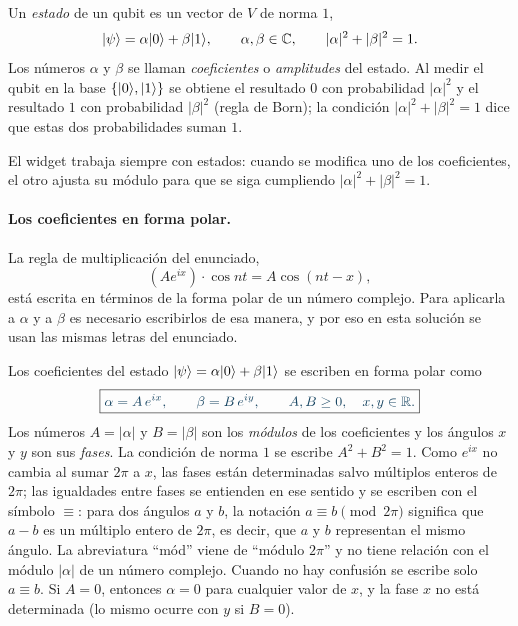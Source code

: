 \begin{definicionT}
Un \emph{estado} de un qubit es un vector de $V$ de norma $1$,
\begin{equation}\label{eq:estado}
  \lvert \psi\rangle=\alpha\lvert 0\rangle+\beta\lvert 1\rangle,\qquad \alpha,\beta\in\mathbb C,\qquad |\alpha|^2+|\beta|^2=1 .
\end{equation}
Los números $\alpha$ y $\beta$ se llaman \emph{coeficientes} o \emph{amplitudes} del estado. Al
medir el qubit en la base $\{\lvert 0\rangle,\lvert 1\rangle\}$ se obtiene el resultado $0$ con probabilidad
$|\alpha|^2$ y el resultado $1$ con probabilidad $|\beta|^2$ (regla de Born); la condición
$|\alpha|^2+|\beta|^2=1$ dice que estas dos probabilidades suman $1$.
\end{definicionT}

El widget trabaja siempre con estados: cuando se modifica uno de los coeficientes, el otro
ajusta su módulo para que se siga cumpliendo $|\alpha|^2+|\beta|^2=1$.

\paragraph{Los coeficientes en forma polar.}
La regla de multiplicación del enunciado,
\[
  (Ae^{ix})\cdot\cos nt=A\cos(nt-x),
\]
está escrita en términos de la forma polar de un número complejo. Para aplicarla a $\alpha$ y a
$\beta$ es necesario escribirlos de esa manera, y por eso en esta solución se usan las mismas
letras del enunciado.

\begin{definicionT}
Los coeficientes del estado $\lvert \psi\rangle=\alpha\lvert 0\rangle+\beta\lvert 1\rangle$ se escriben en forma polar como
\begin{equation}\label{eq:polar-ab}
  \destacado{\alpha=A\,e^{ix},\qquad \beta=B\,e^{iy},\qquad A,B\ge 0,\quad x,y\in\mathbb R .}
\end{equation}
Los números $A=|\alpha|$ y $B=|\beta|$ son los \emph{módulos} de los coeficientes y los ángulos
$x$ y $y$ son sus \emph{fases}. La condición de norma $1$ se escribe $A^2+B^2=1$. Como $e^{ix}$
no cambia al sumar $2\pi$ a $x$, las fases están determinadas salvo múltiplos enteros de $2\pi$;
las igualdades entre fases se entienden en ese sentido y se escriben con el símbolo $\equiv$: para dos ángulos $a$ y $b$, la notación $a\equiv b\pmod{2\pi}$ significa que $a-b$ es un múltiplo entero de $2\pi$, es decir, que $a$ y $b$ representan el mismo ángulo. La abreviatura ``mód'' viene de ``módulo $2\pi$'' y no tiene relación con el módulo $|\alpha|$ de un número complejo. Cuando no hay confusión se escribe solo $a\equiv b$. Si
$A=0$, entonces $\alpha=0$ para cualquier valor de $x$, y la fase $x$ no está determinada (lo
mismo ocurre con $y$ si $B=0$).
\end{definicionT}

